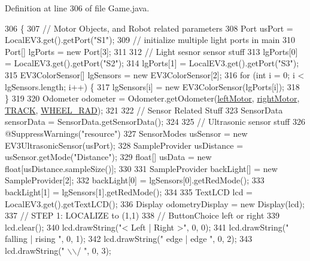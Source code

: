Definition at line 306 of file Game.\+java.


\begin{DoxyCode}
306                                                              \{
307     \textcolor{comment}{// Motor Objects, and Robot related parameters}
308     Port usPort = LocalEV3.get().getPort(\textcolor{stringliteral}{"S1"});
309     \textcolor{comment}{// initialize multiple light ports in main}
310     Port[] lgPorts = \textcolor{keyword}{new} Port[3];
311 
312     \textcolor{comment}{// Light sesnor sensor stuff}
313     lgPorts[0] = LocalEV3.get().getPort(\textcolor{stringliteral}{"S2"});
314     lgPorts[1] = LocalEV3.get().getPort(\textcolor{stringliteral}{"S3"});
315     EV3ColorSensor[] lgSensors = \textcolor{keyword}{new} EV3ColorSensor[2];
316     \textcolor{keywordflow}{for} (\textcolor{keywordtype}{int} i = 0; i < lgSensors.length; i++) \{
317       lgSensors[i] = \textcolor{keyword}{new} EV3ColorSensor(lgPorts[i]);
318     \}
319 
320     Odometer odometer = Odometer.getOdometer(\hyperlink{enumca_1_1mcgill_1_1ecse211_1_1project_1_1_game_a7c673571bf50fdb6917a9d7bb671e003}{leftMotor}, \hyperlink{enumca_1_1mcgill_1_1ecse211_1_1project_1_1_game_a7a05fcf37c4435c32270776a427ba0d2}{rightMotor}, 
      \hyperlink{enumca_1_1mcgill_1_1ecse211_1_1project_1_1_game_a64cf12cdd6772ac1ce351ff1dfadd626}{TRACK}, \hyperlink{enumca_1_1mcgill_1_1ecse211_1_1project_1_1_game_a91bd64670c2a91d006c907142783b1f8}{WHEEL\_RAD});
321 
322     \textcolor{comment}{// Sensor Related Stuff}
323     SensorData sensorData = SensorData.getSensorData();
324 
325     \textcolor{comment}{// Ultrasonic sensor stuff}
326     @SuppressWarnings(\textcolor{stringliteral}{"resource"})
327     SensorModes usSensor = new EV3UltrasonicSensor(usPort);
328     SampleProvider usDistance = usSensor.getMode("Distance");
329     \textcolor{keywordtype}{float}[] usData = new \textcolor{keywordtype}{float}[usDistance.sampleSize()];
330 
331     SampleProvider backLight[] = new SampleProvider[2];
332     backLight[0] = lgSensors[0].getRedMode();
333     backLight[1] = lgSensors[1].getRedMode();
334 
335     TextLCD lcd = LocalEV3.get().getTextLCD();
336     Display odometryDisplay = new Display(lcd);
337     \textcolor{comment}{// STEP 1: LOCALIZE to (1,1)}
338     \textcolor{comment}{// ButtonChoice left or right}
339     lcd.clear();
340     lcd.drawString("<  Left  |  Right >", 0, 0);
341     lcd.drawString(" falling | rising  ", 0, 1);
342     lcd.drawString("  edge   |  edge   ", 0, 2);
343     lcd.drawString("        \(\backslash\)\(\backslash\)/        ", 0, 3);

\end{DoxyCode}
